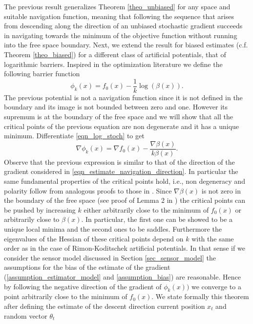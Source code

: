 \documentclass[article]{IEEEtran}
\theoremstyle{definition}
\begin{document}
The previous result generalizes Theorem \ref{theo_unbiased} for any space and suitable navigation function, meaning that following the sequence that arises from descending along the direction of an unbiased stochastic gradient succeeds in navigating towards the minimum of the objective function without running into the free space boundary. Next, we extend the result for biased estimates (c.f. Theorem \ref{theo_biased}) for a different class of artificial potentials, that of logarithmic barriers.
Inspired in the optimization literature we define the following barrier function
%
\begin{equation}\label{eqn_log_stoch}
\phi_k(x) = f_0(x)-\frac{1}{k}\log(\beta(x)).
\end{equation}
%
The previous potential is not a navigation function since it is not defined in the boundary and its image is not bounded between zero and one. However its supremum is at the boundary of the free space and we will show that all the critical points of the previous equation are non degenerate and it has a unique minimum. Differentiate \eqref{eqn_log_stoch} to get 
%
\begin{equation}
  \nabla \phi_k(x) =  \nabla f_0(x) - \frac{\nabla \beta(x)}{k\beta(x)}.
\end{equation}
%
Observe that the previous expression is similar to that of the direction of the gradient considered in \ref{eqn_estimate_navigation_direction}. In particular the same fundamental properties of the critical points hold, i.e., non degeneracy and polarity follow from analogous proofs to those in \cite{PaternainEtal15}. Since $\nabla \beta(x)$ is not zero in the boundary of the free space (see proof of Lemma 2 in \cite{PaternainEtal15}) the critical points can be pushed by increasing $k$ either arbitrarily close to the minimum of $f_0(x)$ or arbitrarily close to $\beta(x)$. In particular, the first one can be showed to be a unique local minima and the second ones to be saddles. Furthermore the eigenvalues of the Hessian of these critical points depend on $k$ with the same order as in the case of Rimon-Koditschek artificial potentials. In that sense if we consider the sensor model discussed in Section \ref{sec_sensor_model} the assumptions for the bias of the estimate of the gradient (\ref{assumption_estimator_model} and \ref{assumption_bias}) are reasonable. Hence by following the negative direction of the gradient of $ \phi_k(x))$ we converge to a point arbitrarily close to the minimum of $f_0(x)$. We state formally this theorem after defining the estimate of the descent direction current position $x_t$ and random vector $\theta_t$
\end{document}
